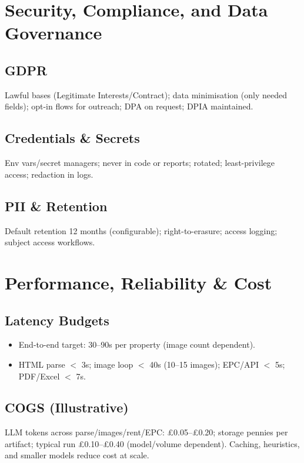 \documentclass[12pt,a4paper]{article}
\begin{document}
\section{Security, Compliance, and Data Governance}
\subsection{GDPR}
Lawful bases (Legitimate Interests/Contract); data minimisation (only needed fields); opt-in flows for outreach; DPA on request; DPIA maintained.

\subsection{Credentials \& Secrets}
Env vars/secret managers; never in code or reports; rotated; least-privilege access; redaction in logs.

\subsection{PII \& Retention}
Default retention 12 months (configurable); right-to-erasure; access logging; subject access workflows.

\section{Performance, Reliability \& Cost}
\subsection{Latency Budgets}
\begin{itemize}[leftmargin=1.5em]
  \item End-to-end target: 30--90s per property (image count dependent).
  \item HTML parse $<$ 3s; image loop $<$ 40s (10--15 images); EPC/API $<$ 5s; PDF/Excel $<$ 7s.
\end{itemize}

\subsection{COGS (Illustrative)}
LLM tokens across parse/images/rent/EPC: \pounds0.05--\pounds0.20; storage pennies per artifact; typical run \pounds0.10--\pounds0.40 (model/volume dependent). Caching, heuristics, and smaller models reduce cost at scale.
\end{document}
